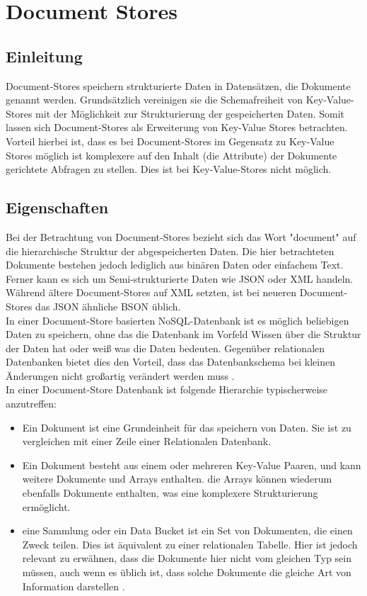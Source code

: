 \section{Document Stores}
\subsection{Einleitung}
Document-Stores speichern strukturierte Daten in Datensätzen, die Dokumente genannt werden. Grundsätzlich vereinigen sie die Schemafreiheit von Key-Value-Stores mit der Möglichkeit zur Strukturierung der gespeicherten Daten. Somit lassen sich Document-Stores als Erweiterung von Key-Value Stores betrachten. Vorteil hierbei ist, dass es bei Document-Stores im Gegensatz zu Key-Value Stores möglich ist komplexere auf den Inhalt (die Attribute) der Dokumente gerichtete Abfragen zu stellen. Dies ist bei Key-Value-Stores nicht möglich.

\subsection{Eigenschaften}
Bei der Betrachtung von Document-Stores bezieht sich das Wort "document" auf die hierarchische Struktur der abgespeicherten Daten. Die hier betrachteten Dokumente bestehen jedoch lediglich aus binären Daten oder einfachem Text. Ferner kann es sich um Semi-strukturierte Daten wie JSON oder XML handeln. Während ältere Document-Stores auf XML setzten, ist bei neueren Document-Stores das JSON ähnliche BSON üblich. 
\\

In einer Document-Store basierten NoSQL-Datenbank ist es möglich beliebigen Daten zu speichern, ohne das die Datenbank im Vorfeld Wissen über die Struktur der Daten hat oder weiß was die Daten bedeuten. Gegenüber relationalen Datenbanken bietet dies den Vorteil, dass das Datenbankschema bei kleinen Änderungen nicht großartig verändert werden muss \cite{harrison01}. 
\\

In einer Document-Store Datenbank ist folgende Hierarchie typischerweise anzutreffen:
\begin{itemize}
\item Ein Dokument ist eine Grundeinheit für das speichern von Daten. Sie ist zu vergleichen mit einer Zeile einer Relationalen Datenbank.
\item Ein Dokument besteht aus einem oder mehreren Key-Value Paaren, und kann weitere Dokumente und Arrays enthalten. die Arrays können wiederum ebenfalls Dokumente enthalten, was eine komplexere Strukturierung ermöglicht.
\item eine Sammlung oder ein Data Bucket ist ein Set von Dokumenten, die einen Zweck teilen. Dies ist äquivalent zu einer relationalen Tabelle. Hier ist jedoch relevant zu erwähnen, dass die Dokumente hier nicht vom gleichen Typ sein müssen, auch wenn es üblich ist, dass solche Dokumente die gleiche Art von Information darstellen \cite{harrison01}.
\end{itemize}


